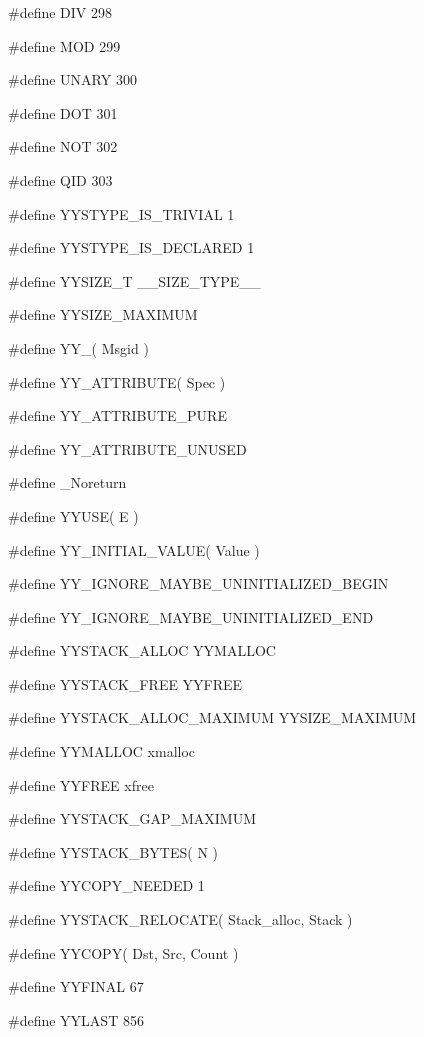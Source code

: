 \medskip
{\stt \#define DIV 298}

\medskip
{\stt \#define MOD 299}

\medskip
{\stt \#define UNARY 300}

\medskip
{\stt \#define DOT 301}

\medskip
{\stt \#define NOT 302}

\medskip
{\stt \#define QID 303}

\medskip
{\stt \#define YYSTYPE\_IS\_TRIVIAL 1}

\medskip
{\stt \#define YYSTYPE\_IS\_DECLARED 1}

\medskip
{\stt \#define YYSIZE\_T \_\_SIZE\_TYPE\_\_}

\medskip
{\stt \#define YYSIZE\_MAXIMUM}

\medskip
{\stt \#define YY\_( Msgid )}

\medskip
{\stt \#define YY\_ATTRIBUTE( Spec )}

\medskip
{\stt \#define YY\_ATTRIBUTE\_PURE}

\medskip
{\stt \#define YY\_ATTRIBUTE\_UNUSED}

\medskip
{\stt \#define \_Noreturn}

\medskip
{\stt \#define YYUSE( E )}

\medskip
{\stt \#define YY\_INITIAL\_VALUE( Value )}

\medskip
{\stt \#define YY\_IGNORE\_MAYBE\_UNINITIALIZED\_BEGIN}

\medskip
{\stt \#define YY\_IGNORE\_MAYBE\_UNINITIALIZED\_END}

\medskip
{\stt \#define YYSTACK\_ALLOC YYMALLOC}

\medskip
{\stt \#define YYSTACK\_FREE YYFREE}

\medskip
{\stt \#define YYSTACK\_ALLOC\_MAXIMUM YYSIZE\_MAXIMUM}

\medskip
{\stt \#define YYMALLOC xmalloc}

\medskip
{\stt \#define YYFREE xfree}

\medskip
{\stt \#define YYSTACK\_GAP\_MAXIMUM}

\medskip
{\stt \#define YYSTACK\_BYTES( N )}

\medskip
{\stt \#define YYCOPY\_NEEDED 1}

\medskip
{\stt \#define YYSTACK\_RELOCATE( Stack\_alloc, Stack )}

\medskip
{\stt \#define YYCOPY( Dst, Src, Count )}

\medskip
{\stt \#define YYFINAL 67}

\medskip
{\stt \#define YYLAST 856}

